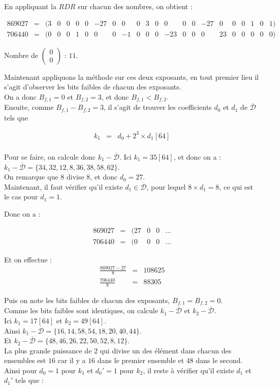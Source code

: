 \documentclass[12pt, a4paper]{memoir}
\newcommand{\doublezero}{\begin{pmatrix} 0 \\ 0 \end{pmatrix}}
\newcommand{\dbarre}{\overline{\mathcal{D}}}
\begin{document}
 En appliquant la $RDR$ sur chacun des nombres, on obtient :
 
 $$\begin{array}{ccccccccccccccccccccccc}
  869027 & = & (3 & 0 & 0 & 0 & 0 & -27 & 0 & 0 & 0 & 3 & 0 & 0 & 0 & 0 & -27 & 0 & 0 & 0 & 1 & 0 & 1) \\
  706440 & = & (0 & 0 & 0 & 1 & 0 & 0 & 0 & -1 & 0 & 0 & 0 & -23 & 0 & 0 & 0 & 23 & 0 & 0 & 0 & 0 & 0)
 \end{array}$$

 Nombre de $\doublezero$ : $11$.
 
Maintenant appliquons la méthode sur ces deux exposants, en tout premier lieu il s'agit d'observer les bits faibles de chacun 
des exposants. \\
On a donc $B_{f,1} = 0$ et $B_{f,2} = 3$, et donc $B_{f,1} < B_{f,2}$. \\
Ensuite, comme $B_{f,1} - B_{f,2} = 3$, il s'agit de trouver les coefficients $d_0$ et $d_1$ de $\dbarre$ tels que

  $$\begin{array}{ccc}
k_1 & = & d_0 + 2^3 \times d_1[64] \\
 \end{array}$$

 Pour se faire, on calcule donc $k_1 - \dbarre$.
 Ici $k_1 = 35 [64]$, et donc on a : \\
 $k_1 - \dbarre = \{34,32,12,8,36,38,58,62\}$. \\
 On remarque que $8$ divise $8$, et donc $d_0 = 27$. \\
 Maintenant, il faut vérifier qu'il existe $d_1 \in \dbarre$, pour lequel
 $8 \times d_1 = 8$, ce qui est le cas pour $d_1 = 1$.
 
 Donc on a :
 
 $$\begin{array}{cccccc}
  869027 & = & (27 & 0 & 0 & \ldots \\
  706440 & = & (0 & 0 & 0 & \ldots
 \end{array}$$
 
 Et on effectue :
 $$\begin{array}{cccccc}
  \frac{869027 - 27}{8} & = & 108625 \\
  \frac{706440}{8} & = & 88305
 \end{array}$$
 
Puis on note les bits faibles de chacun des exposants, $B_{f,1} = B_{f,2} = 0$. \\
Comme les bits faibles sont identiques, on calcule $k_1 - \dbarre$ et $k_2 - \dbarre$. \\
Ici $k_1 = 17 [64]$ et $k_2 = 49 [64]$. \\
Ainsi  $k_1 - \dbarre = \{16,14,58,54,18,20,40,44\}$. \\
Et  $k_2 - \dbarre = \{48,46,26,22,50,52,8,12\}$. \\ 
La plus grande puissance de $2$ qui divise un des élément dans chacun des ensembles est $16$
car il y a $16$ dans le premier ensemble et $48$ dans le second. \\
Ainsi pour $d_0 = 1$ pour $k_1$ et $d_0' = 1$ pour $k_2$, il reste à vérifier qu'il existe $d_1$ et 
$d_1'$ tels que :
\end{document}
